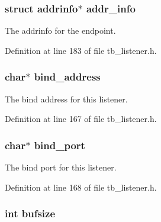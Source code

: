 \hypertarget{structtb__listener__t_aab742bc33815bd69bf49ad1861006b97}{
\subsubsection[{addr\-\_\-info}]{\setlength{\rightskip}{0pt plus 5cm}struct addrinfo$\ast$ addr\-\_\-info}}\label{structtb__listener__t_aab742bc33815bd69bf49ad1861006b97}


The addrinfo for the endpoint. 



Definition at line 183 of file tb\-\_\-listener.\-h.

\hypertarget{structtb__listener__t_ae15b37b2cdfd51bbb2719e4eb3ffb917}{
\subsubsection[{bind\-\_\-address}]{\setlength{\rightskip}{0pt plus 5cm}char$\ast$ bind\-\_\-address}}\label{structtb__listener__t_ae15b37b2cdfd51bbb2719e4eb3ffb917}


The bind address for this listener. 



Definition at line 167 of file tb\-\_\-listener.\-h.

\hypertarget{structtb__listener__t_a5c96fa09c995ca60f7b334c1842eb991}{
\subsubsection[{bind\-\_\-port}]{\setlength{\rightskip}{0pt plus 5cm}char$\ast$ bind\-\_\-port}}\label{structtb__listener__t_a5c96fa09c995ca60f7b334c1842eb991}


The bind port for this listener. 



Definition at line 168 of file tb\-\_\-listener.\-h.

\hypertarget{structtb__listener__t_a199ab88d4ca8eab30e1cb7d35edacca5}{
\subsubsection[{bufsize}]{\setlength{\rightskip}{0pt plus 5cm}int bufsize}}\label{structtb__listener__t_a199ab88d4ca8eab30e1cb7d35edacca5}


